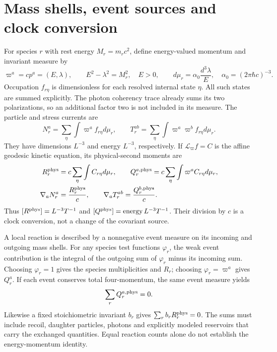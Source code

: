 \section{Mass shells, event sources and clock conversion}

For species $r$ with rest energy $M_r=m_rc^2$, define energy-valued momentum and invariant measure by
\begin{equation}
 \varpi^a=cp^a=(E,\lambda),\qquad
 E^2-\lambda^2=M_r^2,\quad E>0,\qquad
 d\mu_r=\alpha_0\frac{d^3\lambda}{E},\quad
 \alpha_0=(2\pi\hbar c)^{-3}.
 \label{ii:mass_shell}
\end{equation}
Occupation $f_{r\eta}$ is dimensionless for each resolved internal state $\eta$. All such states are summed explicitly. The photon coherency trace already sums its two polarizations, so an additional factor two is not included in its measure. The particle and stress currents are
\begin{equation}
 N_r^a=\sum_\eta\int\varpi^af_{r\eta}d\mu_r,\qquad
 T_r^{ab}=\sum_\eta\int\varpi^a\varpi^bf_{r\eta}d\mu_r.
 \label{ii:kinetic_moments}
\end{equation}
They have dimensions $L^{-3}$ and energy $L^{-3}$, respectively. If $\mathscr L_\varpi f=C$ is the affine geodesic kinetic equation, its physical-second moments are
\begin{align}
 R_r^{\rm phys}&=c\sum_\eta\int C_{r\eta}d\mu_r,\qquad
 Q_r^{a,\rm phys}=c\sum_\eta\int\varpi^aC_{r\eta}d\mu_r,\nonumber\\
 \nabla_aN_r^a&=\frac{R_r^{\rm phys}}c,\qquad
 \nabla_aT_r^{ab}=\frac{Q_r^{b,\rm phys}}c.
 \label{ii:source_clock}
\end{align}
Thus $[R^{\rm phys}]=L^{-3}T^{-1}$ and $[Q^{\rm phys}]={\rm energy}\,L^{-3}T^{-1}$. Their division by $c$ is a clock conversion, not a change of the covariant source.

A local reaction is described by a nonnegative event measure on its incoming and outgoing mass shells. For any species test functions $\varphi_r$, the weak event contribution is the integral of the outgoing sum of $\varphi_r$ minus its incoming sum. Choosing $\varphi_r=1$ gives the species multiplicities and $R_r$; choosing $\varphi_r=\varpi^a$ gives $Q_r^a$. If each event conserves total four-momentum, the same event measure yields
\begin{equation}
 \sum_rQ_r^{a,\rm phys}=0.
 \label{ii:event_conservation}
\end{equation}
Likewise a fixed stoichiometric invariant $b_r$ gives $\sum_rb_rR_r^{\rm phys}=0$. The sums must include recoil, daughter particles, photons and explicitly modeled reservoirs that carry the exchanged quantities. Equal reaction counts alone do not establish the energy-momentum identity.

